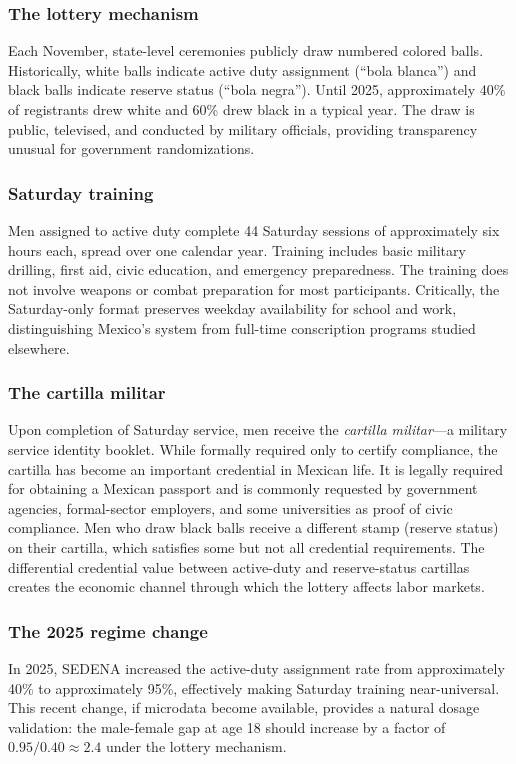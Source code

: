 \documentclass[12pt]{article}
\begin{document}
\subsubsection*{The lottery mechanism} Each November, state-level ceremonies publicly draw numbered colored balls. Historically, white balls indicate active duty assignment (``bola blanca'') and black balls indicate reserve status (``bola negra''). Until 2025, approximately 40\% of registrants drew white and 60\% drew black in a typical year. The draw is public, televised, and conducted by military officials, providing transparency unusual for government randomizations.

\subsubsection*{Saturday training} Men assigned to active duty complete 44 Saturday sessions of approximately six hours each, spread over one calendar year. Training includes basic military drilling, first aid, civic education, and emergency preparedness. The training does not involve weapons or combat preparation for most participants. Critically, the Saturday-only format preserves weekday availability for school and work, distinguishing Mexico's system from full-time conscription programs studied elsewhere.

\subsubsection*{The cartilla militar} Upon completion of Saturday service, men receive the \textit{cartilla militar}---a military service identity booklet. While formally required only to certify compliance, the cartilla has become an important credential in Mexican life. It is legally required for obtaining a Mexican passport and is commonly requested by government agencies, formal-sector employers, and some universities as proof of civic compliance. Men who draw black balls receive a different stamp (reserve status) on their cartilla, which satisfies some but not all credential requirements. The differential credential value between active-duty and reserve-status cartillas creates the economic channel through which the lottery affects labor markets.

\subsubsection*{The 2025 regime change} In 2025, SEDENA increased the active-duty assignment rate from approximately 40\% to approximately 95\%, effectively making Saturday training near-universal. This recent change, if microdata become available, provides a natural dosage validation: the male-female gap at age 18 should increase by a factor of $0.95/0.40 \approx 2.4$ under the lottery mechanism.
\end{document}
